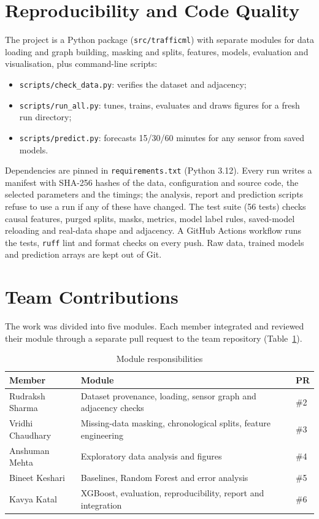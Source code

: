 \documentclass[conference]{IEEEtran}
\begin{document}
\section{Reproducibility and Code Quality}
\label{sec:repro}
The project is a Python package (\texttt{src/trafficml}) with separate modules for data loading and graph building, masking and splits, features, models, evaluation and visualisation, plus command-line scripts:
\begin{itemize}
\item \texttt{scripts/check\_data.py}: verifies the dataset and adjacency;
\item \texttt{scripts/run\_all.py}: tunes, trains, evaluates and draws figures for a fresh run directory;
\item \texttt{scripts/predict.py}: forecasts 15/30/60 minutes for any sensor from saved models.
\end{itemize}
Dependencies are pinned in \texttt{requirements.txt} (Python 3.12). Every run writes a manifest with SHA-256 hashes of the data, configuration and source code, the selected parameters and the timings; the analysis, report and prediction scripts refuse to use a run if any of these have changed. The test suite (56 tests) checks causal features, purged splits, masks, metrics, model label rules, saved-model reloading and real-data shape and adjacency. A GitHub Actions workflow runs the tests, \texttt{ruff} lint and format checks on every push. Raw data, trained models and prediction arrays are kept out of Git.

\section{Team Contributions}
\label{sec:team}
The work was divided into five modules. Each member integrated and reviewed their module through a separate pull request to the team repository (Table~\ref{tab:team}).

\begin{table}[t]
\centering
\caption{Module responsibilities}
\label{tab:team}
\footnotesize
\begin{tabular}{>{\raggedright\arraybackslash}p{}>{\raggedright\arraybackslash}p{}l}
\toprule
Member & Module & PR \\
\midrule
Rudraksh Sharma & Dataset provenance, loading, sensor graph and adjacency checks & \#2 \\
Vridhi Chaudhary & Missing-data masking, chronological splits, feature engineering & \#3 \\
Anshuman Mehta & Exploratory data analysis and figures & \#4 \\
Bineet Keshari & Baselines, Random Forest and error analysis & \#5 \\
Kavya Katal & XGBoost, evaluation, reproducibility, report and integration & \#6 \\
\bottomrule
\end{tabular}
\end{table}
\end{document}
